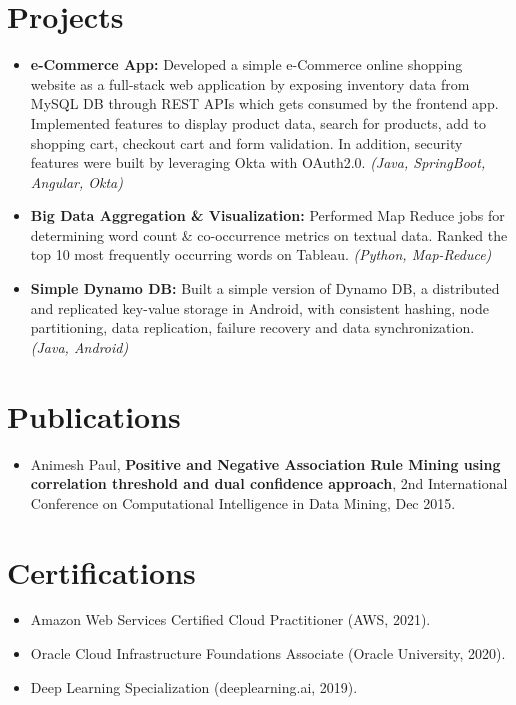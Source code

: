 \documentclass[letterpaper,11pt]{article}
\newcommand{\resumeItem}[2]{
  \item\small{
    \textbf{#1}{ #2 \vspace{-2pt}}
  }
}
\newcommand{\resumeSubItem}[2]{\resumeItem{#1}{#2}\vspace{-4pt}}
\newcommand{\resumeSubHeadingListStart}{\begin{itemize}[leftmargin=*]}
\newcommand{\resumeSubHeadingListEnd}{\end{itemize}}
\begin{document}
\section{Projects}
  \resumeSubHeadingListStart
  \resumeSubItem{e-Commerce App:}
      {Developed a simple e-Commerce online shopping website as a full-stack web application by exposing inventory data from MySQL DB through REST APIs which gets consumed by the frontend app. Implemented features to display product data, search for products, add to shopping cart, checkout cart and form validation. In addition, security features were built by leveraging Okta with OAuth2.0. \emph{(Java, SpringBoot, Angular, Okta)}}
    \resumeSubItem{Big Data Aggregation \& Visualization:}
      {Performed Map Reduce jobs for determining word count \& co-occurrence metrics on textual data. Ranked the top 10 most frequently occurring words on Tableau. \emph{(Python, Map-Reduce)}}
    \resumeSubItem{Simple Dynamo DB:}
      {Built a simple version of Dynamo DB, a distributed and replicated key-value storage in Android, with consistent hashing, node partitioning, data replication, failure recovery and data synchronization. \emph{(Java, Android)}}
  \resumeSubHeadingListEnd

\section{Publications}
 \resumeSubHeadingListStart
  \resumeSubItem{}{Animesh Paul,
  \textbf{Positive and Negative Association Rule Mining using correlation threshold and dual confidence approach}, 2nd International Conference on Computational Intelligence in Data Mining, Dec 2015.}
 \resumeSubHeadingListEnd


\section{Certifications}
 \resumeSubHeadingListStart
 \resumeSubItem{}{Amazon Web Services Certified Cloud Practitioner (AWS, 2021).}
 \resumeSubItem{}{Oracle Cloud Infrastructure Foundations Associate (Oracle University, 2020).}
 \resumeSubItem{}{Deep Learning Specialization (deeplearning.ai, 2019).}
 \resumeSubHeadingListEnd
\end{document}

